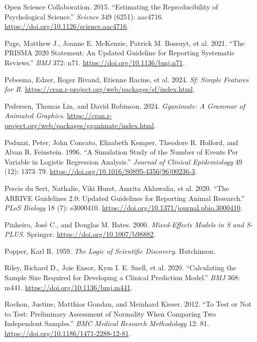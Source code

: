 \documentclass[
]{book}
\newlength{\cslhangindent}
\newenvironment{CSLReferences}[2] %
 {\begin{list}{}{%
  \setlength{\itemindent}{0pt}
  \setlength{\leftmargin}{0pt}
  \setlength{\parsep}{0pt}
  \ifodd #1
   \setlength{\leftmargin}{\cslhangindent}
   \setlength{\itemindent}{-1\cslhangindent}
  \fi
  \setlength{\itemsep}{#2\baselineskip}}}
 {\end{list}}
\begin{document}
\begin{CSLReferences}{1}{1}
Open Science Collaboration. 2015. {``Estimating the Reproducibility of Psychological Science.''} \emph{Science} 349 (6251): aac4716. \url{https://doi.org/10.1126/science.aac4716}.

{Page, Matthew J., Joanne E. McKenzie, Patrick M. Bossuyt, et al.} 2021. {``The {PRISMA} 2020 Statement: An Updated Guideline for Reporting Systematic Reviews.''} \emph{BMJ} 372: n71. \url{https://doi.org/10.1136/bmj.n71}.

Pebesma, Edzer, Roger Bivand, Etienne Racine, et al. 2024. \emph{Sf: Simple Features for {R}}. \url{https://cran.r-project.org/web/packages/sf/index.html}.

Pedersen, Thomas Lin, and David Robinson. 2024. \emph{Gganimate: A Grammar of Animated Graphics}. \url{https://cran.r-project.org/web/packages/gganimate/index.html}.

Peduzzi, Peter, John Concato, Elizabeth Kemper, Theodore R. Holford, and Alvan R. Feinstein. 1996. {``A Simulation Study of the Number of Events Per Variable in Logistic Regression Analysis.''} \emph{Journal of Clinical Epidemiology} 49 (12): 1373--79. \url{https://doi.org/10.1016/S0895-4356(96)00236-3}.

{Percie du Sert, Nathalie, Viki Hurst, Amrita Ahluwalia, et al.} 2020. {``The {ARRIVE} Guidelines 2.0: Updated Guidelines for Reporting Animal Research.''} \emph{PLoS Biology} 18 (7): e3000410. \url{https://doi.org/10.1371/journal.pbio.3000410}.

Pinheiro, José C., and Douglas M. Bates. 2000. \emph{Mixed-Effects Models in {S} and {S-PLUS}}. Springer. \url{https://doi.org/10.1007/b98882}.

Popper, Karl R. 1959. \emph{The Logic of Scientific Discovery}. Hutchinson.

{Riley, Richard D., Joie Ensor, Kym I. E. Snell, et al.} 2020. {``Calculating the Sample Size Required for Developing a Clinical Prediction Model.''} \emph{BMJ} 368: m441. \url{https://doi.org/10.1136/bmj.m441}.

Rochon, Justine, Matthias Gondan, and Meinhard Kieser. 2012. {``To Test or Not to Test: Preliminary Assessment of Normality When Comparing Two Independent Samples.''} \emph{BMC Medical Research Methodology} 12: 81. \url{https://doi.org/10.1186/1471-2288-12-81}.


\end{CSLReferences}
\end{document}
